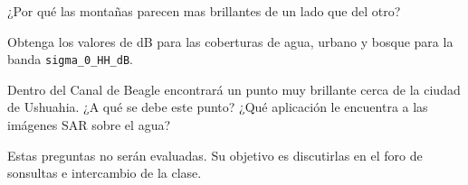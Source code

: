 \begin{que}
    ¿Por qué las montañas parecen mas brillantes de un lado que del otro?
\end{que}

\begin{que}
    Obtenga los valores de dB para las coberturas de agua, urbano y bosque para la banda \texttt{sigma\_0\_HH\_dB}.
\end{que}

\begin{que}
    Dentro del Canal de Beagle encontrará un punto muy brillante cerca de la ciudad de Ushuahia. ¿A qué se debe este punto? ¿Qué aplicación le encuentra a las imágenes SAR sobre el agua?
\end{que}

Estas preguntas no serán evaluadas. Su objetivo es discutirlas en el foro de sonsultas e intercambio de la clase.
